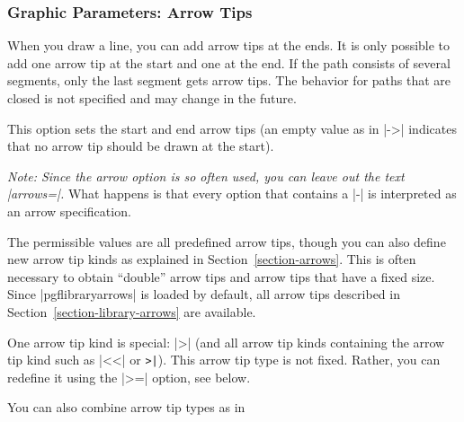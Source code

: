 \subsubsection{Graphic Parameters: Arrow Tips}

When you draw a line, you can add arrow tips at the ends. It is
only possible to add one arrow tip at the start and one at the end. If
the path consists of several segments, only the last segment gets
arrow tips. The behavior for paths that are closed is not specified
and may change in the future.

\begin{itemize}
  This option sets the start and end arrow tips (an empty value as in |->|
  indicates that no arrow tip should be drawn at the start).%

  \emph{Note: Since the arrow option is so often used, you can leave
    out the text |arrows=|.} What happens is that every option that
  contains a |-| is interpreted as an arrow specification.

\begin{codeexample}[]
\end{codeexample}

  The permissible values are all predefined arrow tips, though
  you can also define new arrow tip kinds as explained in
  Section~\ref{section-arrows}. This is often necessary to obtain
  ``double'' arrow tips and arrow tips that have a fixed size. Since
  |pgflibraryarrows| is loaded by default, all arrow tips described in
  Section~\ref{section-library-arrows} are available.

  One arrow tip kind is special: |>| (and all arrow tip kinds containing the
  arrow tip kind such as |<<| or \verb!>|!). This arrow tip type is not  
  fixed. Rather, you can redefine it using the |>=| option, see
  below. 

  \example You can also combine arrow tip types as in
\begin{codeexample}[]
\begin{tikzpicture}[thick]
  \draw[to reversed-to]   (0,0) .. controls +(.5,0) and +(-.5,-.5) .. +(1.5,1);
  \draw[[-latex reversed] (1,0) .. controls +(.5,0) and +(-.5,-.5) .. +(1.5,1);
  \draw[latex-)]          (2,0) .. controls +(.5,0) and +(-.5,-.5) .. +(1.5,1);
  \useasboundingbox (-.1,-.1) rectangle (3.1,1.1); %
\end{tikzpicture}
\end{codeexample}


\end{itemize}
